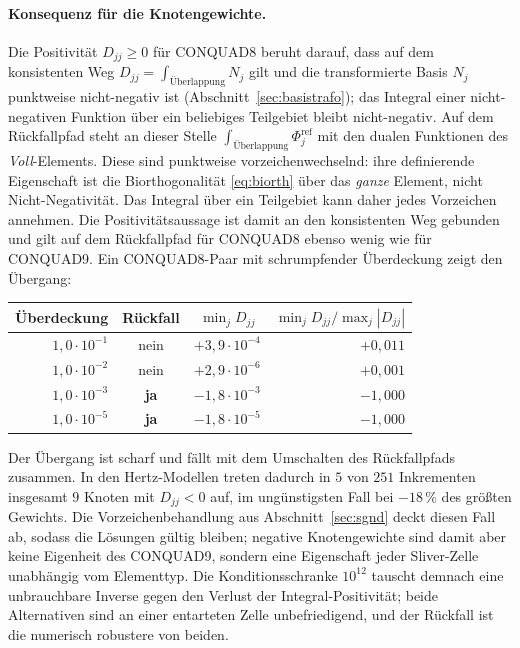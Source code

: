 \documentclass[a4paper,11pt]{article}
\def\tilde#1{#1}%
\begin{document}
\paragraph{Konsequenz für die Knotengewichte.}
Die Positivität $\tilde D_{jj}\ge0$ für CONQUAD8 beruht darauf, dass auf dem konsistenten Weg
$\tilde D_{jj}=\int_{\text{Überlappung}}\tilde N_j$ gilt und die transformierte Basis $\tilde N_j$
punktweise nicht-negativ ist (Abschnitt~\ref{sec:basistrafo}); das Integral einer nicht-negativen
Funktion über ein beliebiges Teilgebiet bleibt nicht-negativ. Auf dem Rückfallpfad steht an dieser
Stelle $\int_{\text{Überlappung}}\Phi_j^{\text{ref}}$ mit den dualen Funktionen des
\emph{Voll}-Elements. Diese sind punktweise vorzeichenwechselnd: ihre definierende Eigenschaft ist
die Biorthogonalität \eqref{eq:biorth} über das \emph{ganze} Element, nicht Nicht-Negativität. Das
Integral über ein Teilgebiet kann daher jedes Vorzeichen annehmen. Die Positivitätsaussage ist damit an den konsistenten
Weg gebunden und gilt auf dem Rückfallpfad für CONQUAD8 ebenso wenig wie für CONQUAD9. Ein
CONQUAD8-Paar mit schrumpfender Überdeckung zeigt den Übergang:

\begin{center}
\small
\begin{tabular}{rccr}
\toprule
Überdeckung & Rückfall & $\min_j\tilde D_{jj}$ & $\min_j\tilde D_{jj}/\max_j|\tilde D_{jj}|$ \\
\midrule
$1{,}0\cdot10^{-1}$ & nein & $+3{,}9\cdot10^{-4}$ & $+0{,}011$ \\
$1{,}0\cdot10^{-2}$ & nein & $+2{,}9\cdot10^{-6}$ & $+0{,}001$ \\
$1{,}0\cdot10^{-3}$ & \textbf{ja} & $-1{,}8\cdot10^{-3}$ & $-1{,}000$ \\
$1{,}0\cdot10^{-5}$ & \textbf{ja} & $-1{,}8\cdot10^{-5}$ & $-1{,}000$ \\
\bottomrule
\end{tabular}
\end{center}

\noindent Der Übergang ist scharf und fällt mit dem Umschalten des Rückfallpfads zusammen. In den
Hertz-Modellen treten dadurch in $5$ von $251$ Inkrementen insgesamt $9$ Knoten mit
$\tilde D_{jj}<0$ auf, im ungünstigsten Fall bei $-18\,\%$ des größten Gewichts. Die
Vorzeichenbehandlung aus Abschnitt~\ref{sec:sgnd} deckt diesen Fall ab, sodass die Lösungen
gültig bleiben; negative Knotengewichte sind damit aber keine Eigenheit des CONQUAD9, sondern
eine Eigenschaft jeder Sliver-Zelle unabhängig vom Elementtyp. Die Konditionsschranke $10^{12}$
tauscht demnach eine unbrauchbare Inverse gegen den Verlust der Integral-Positivität; beide
Alternativen sind an einer entarteten Zelle unbefriedigend, und der Rückfall ist die numerisch
robustere von beiden.
\end{document}

